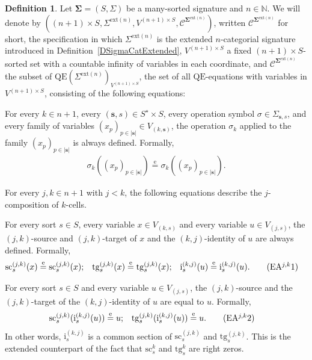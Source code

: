 \documentclass{amsart}
\theoremstyle{plain}
\theoremstyle{definition}
\newtheorem{definition}[theorem]{Definition}
\begin{document}
\begin{definition}\label{DVarExtended}
Let $\mathbf{\Sigma}=(S,\Sigma)$ be a many-sorted signature and $n\in\mathbb{N}$. We will denote by $((n+1)\times S,\Sigma^{\mathrm{ext}(n)},V^{(n+1)\times S},\mathcal{C}^{\mathbf{\Sigma}^{\mathrm{ext}(n)}})$, written $\boldsymbol{\mathcal{C}}^{\mathbf{\Sigma}^{\mathrm{ext}(n)}}$ for short, the specification in which $\Sigma^{\mathrm{ext}(n)}$ is the extended $n$-categorial signature introduced in Definition~\ref{DSigmaCatExtended}, $V^{(n+1)\times S}$ a fixed $(n+1)\times S$-sorted set with a countable infinity of variables in each coordinate, and $\mathcal{C}^{\mathbf{\Sigma}^{\mathrm{ext}(n)}}$ the subset of $\mathrm{QE}(\Sigma^{\mathrm{ext}(n)})_{V^{(n+1)\times S}}$, the set of all $\mathrm{QE}$-equations with variables in $V^{(n+1)\times S}$, consisting of the following equations:

For every $k\in n+1$, every $(\mathbf{s},s)\in S^{\star}\times S$, every operation symbol $\sigma\in \Sigma_{\mathbf{s},s}$, and every family of variables $(x_{p})_{p\in \lvert\mathbf{s}\rvert}\in V_{(k,\mathbf{s})}$, the operation $\sigma_{k}$ applied to the family $(x_{p})_{p\in \lvert\mathbf{s}\rvert}$ is always defined. Formally,
\allowdisplaybreaks
\begin{align*}
\sigma_{k}((x_{p})_{p\in \lvert\mathbf{s}\rvert})\overset{\mathrm{e}}{=}\sigma_{k}((x_{p})_{p\in \lvert\mathbf{s}\rvert}).\label{DVarExtendedEA0}\tag{EA0}
\end{align*}

For every $j,k\in n+1$ with $j<k$, the following equations describe the $j$-composition of $k$-cells.

For every sort $s\in S$, every variable $x\in V_{(k,s)}$ and every variable $u\in V_{(j,s)}$, the $(j,k)$-source and $(j,k)$-target of $x$ and the $(k,j)$-identity of $u$ are always defined. Formally,
\allowdisplaybreaks
\begin{align*}
\mathrm{sc}^{(j,k)}_{s}(x)&\overset{\mathrm{e}}{=}\mathrm{sc}^{(j,k)}_{s}(x);
&
\mathrm{tg}^{(j,k)}_{s}(x)&\overset{\mathrm{e}}{=}\mathrm{tg}^{(j,k)}_{s}(x);
&
\mathrm{i}^{(k,j)}_{s}(u)&\overset{\mathrm{e}}{=}\mathrm{i}^{(k,j)}_{s}(u).\label{DVarExtendedEAjk1}\tag{EA$^{j,k}$1}
\end{align*}

For every sort $s\in S$ and every variable $u\in V_{(j,s)}$, the $(j,k)$-source and the $(j,k)$-target of the $(k,j)$-identity of $u$ are equal to $u$. Formally,
\allowdisplaybreaks
\begin{align*}
\mathrm{sc}^{(j,k)}_{s}(\mathrm{i}^{(k,j)}_{s}(u))&\overset{\mathrm{e}}{=}u;
&
\mathrm{tg}^{(j,k)}_{s}(\mathrm{i}^{(k,j)}_{s}(u))&\overset{\mathrm{e}}{=}u.\label{DVarExtendedEAjk2}\tag{EA$^{j,k}$2}
\end{align*}
In other words, $\mathrm{i}^{(k,j)}_{s}$ is a common section of $\mathrm{sc}^{(j,k)}_{s}$ and $\mathrm{tg}^{(j,k)}_{s}$. This is the extended counterpart of the fact that $\mathrm{sc}^{k}_{s}$ and $\mathrm{tg}^{k}_{s}$ are right zeros.


\end{definition}
\end{document}
